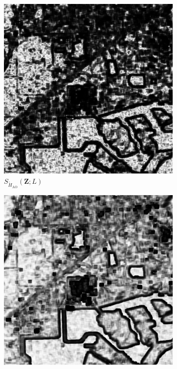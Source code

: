 \begin{figure}[H]
  \centering
  \begin{subfigure}[b]{0.3\textwidth}
    \centering
    \includegraphics[width=\textwidth]{../../Figures/PNG/H_pvalue_lake_512_36L_AO_100b}
    \caption{$S_{\widetilde{H}_{\text{AO}}}(\bm{Z}; L)$}
    \label{fig:lake_pvalue-1}
  \end{subfigure}
  \hfill
  \begin{subfigure}[b]{0.3\textwidth}
    \centering
    \includegraphics[width=\textwidth]{../../Figures/PNG/cv_pvalues_lake_512}

\end{subfigure}
\end{figure}
